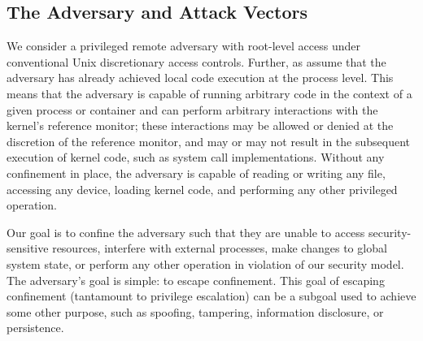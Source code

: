 
\subsection{The Adversary and Attack Vectors}

We consider a privileged remote adversary with root-level access under conventional Unix
discretionary access controls.  Further, as assume that the adversary has already achieved
local code execution at the process level. This means that the adversary is capable of
running arbitrary code in the context of a given process or container and can perform
arbitrary interactions with the kernel's reference monitor; these interactions may be
allowed or denied at the discretion of the reference monitor, and may or may not result in
the subsequent execution of kernel code, such as system call implementations. Without any
confinement in place, the adversary is capable of reading or writing any file, accessing
any device, loading kernel code, and performing any other privileged operation.

Our goal is to confine the adversary such that they are unable to access
security-sensitive resources, interfere with external processes, make changes to global
system state, or perform any other operation in violation of our security model.  The
adversary's goal is simple: to escape confinement. This goal of escaping confinement
(tantamount to privilege escalation) can be a subgoal used to achieve some other purpose,
such as spoofing, tampering, information disclosure, or persistence.



